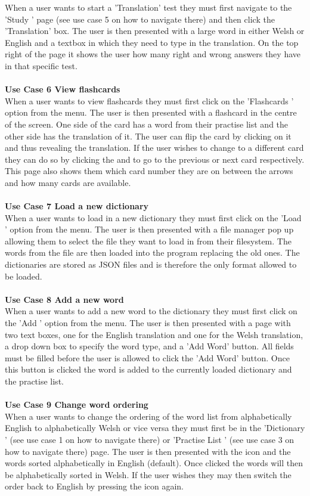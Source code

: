 \documentclass{project}
\newcommand*{\icon}[1]{%
  \raisebox{-.3\baselineskip}{%
    \texttt{[image: \#1]}%
  }%
}
\begin{document}
When a user wants to start a 'Translation' test they must first navigate to the 'Study \icon{study-icon}' page (see use case 5 on how to navigate there) and then click the 'Translation' box. The user is then presented with a large word in either Welsh or English and a textbox in which they need to type in the translation. On the top right of the page it shows the user how many right and wrong answers they have in that specific test.
\\\\
\textbf{Use Case 6 View flashcards}
\\
When a user wants to view flashcards they must first click on the 'Flashcards \icon{flashcard-icon}' option from the menu. The user is then presented with a flashcard in the centre of the screen. One side of the card has a word from their practise list and the other side has the translation of it. The user can flip the card by clicking on it and thus revealing the translation. If the user wishes to change to a different card they can do so by clicking the \icon{left-icon} and \icon{right-icon} to go to the previous or next card respectively. This page also shows them which card number they are on between the arrows and how many cards are available.
\\\\
\textbf{Use Case 7 Load a new dictionary}
\\
When a user wants to load in a new dictionary they must first click on the 'Load \icon{load-icon}' option from the menu. The user is then presented with a file manager pop up allowing them to select the file they want to load in from their filesystem. The words from the file are then loaded into the program replacing the old ones. The dictionaries are stored as JSON files and is therefore the only format allowed to be loaded.
\\\\
\textbf{Use Case 8 Add a new word}
\\
When a user wants to add a new word to the dictionary they must first click on the 'Add \icon{add-icon}' option from the menu. The user is then presented with a page with two text boxes, one for the English translation and one for the Welsh translation, a drop down box to specify the word type, and a 'Add Word' button. All fields must be filled before the user is allowed to click the 'Add Word' button. Once this button is clicked the word is added to the currently loaded dictionary and the practise list.
\\\\
\textbf{Use Case 9 Change word ordering}
\\
When a user wants to change the ordering of the word list from alphabetically English to alphabetically Welsh or vice versa they must first be in the 'Dictionary \icon{dictionary-icon}' (see use case 1 on how to navigate there) or 'Practise List \icon{practise-icon}' (see use case 3 on how to navigate there) page. The user is then presented with the \icon{order-icon} icon and the words sorted alphabetically in English (default). Once clicked the words will then be alphabetically sorted in Welsh. If the user wishes they may then switch the order back to English by pressing the \icon{order-icon} icon again.
\\
\end{document}
